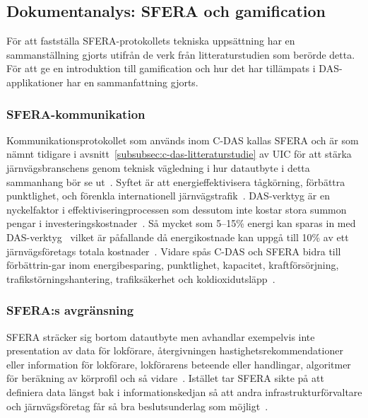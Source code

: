 \subsection{Dokumentanalys: SFERA och gamification}\label{subsec:dokumentanalys}
För att fastställa SFERA-protokollets tekniska uppsättning har en sammanställning gjorts utifrån de verk från litteraturstudien som berörde detta.
För att ge en introduktion till gamification och hur det har tillämpats i DAS-applikationer har en sammanfattning gjorts.

\subsubsection{SFERA-kommunikation}
Kommunikationsprotokollet som används inom C-DAS kallas SFERA och är som nämnt tidigare i avsnitt~\ref{subsubsec:c-das-litteraturstudie} av UIC för att stärka järnvägsbranschens genom teknisk vägledning i hur datautbyte i detta sammanhang bör se ut~\cite{IRS90940}.
Syftet är att energieffektivisera tågkörning, förbättra punktlighet, och förenkla internationell järnvägstrafik~\cite{IRS90940}.
DAS-verktyg är en nyckelfaktor i effektiviseringprocessen som dessutom inte kostar stora summon pengar i investeringskostnader~\cite{IRS90940}.
Så mycket som 5--15\% energi kan sparas in med DAS-verktyg~\cite{IRS90940, Yang2013} vilket är påfallande då energikostnade kan uppgå till 10\% av ett järnvägsföretags totala kostnader~\cite{Cwil2018}.
Vidare spås C-DAS och SFERA bidra till förbättrin-gar inom energibesparing, punktlighet, kapacitet, kraftförsörjning, trafikstörningshantering, trafiksäkerhet och koldioxidutsläpp~\cite{IRS90940}.
\subsubsection{SFERA:s avgränsning}
SFERA sträcker sig bortom datautbyte men avhandlar exempelvis inte presentation av data för lokförare, återgivningen hastighetsrekommendationer eller information för lokförare, lokförarens beteende eller handlingar, algoritmer för beräkning av körprofil och så vidare~\cite{IRS90940}.
Istället tar SFERA sikte på att definiera data längst bak i informationskedjan så att andra infrastrukturförvaltare och järnvägsföretag får så bra beslutsunderlag som möjligt~\cite{IRS90940}.
